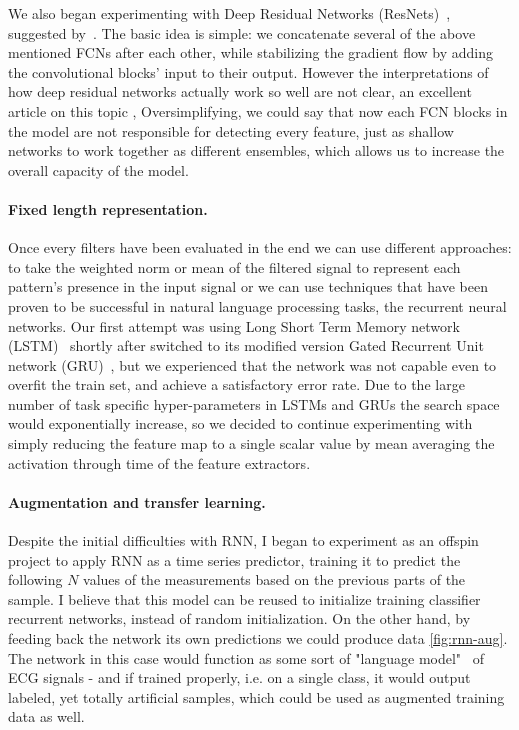 We also began experimenting with Deep Residual Networks (ResNets)~\cite{he2016deep}, suggested by~\cite{wang2016time}.
The basic idea is simple: we concatenate several of the above mentioned FCNs after each other, while stabilizing the gradient flow by adding the convolutional blocks' input to their output.
However the interpretations of how deep residual networks actually work so well are not clear, an excellent article on this topic \cite{resnet-ensembles},
Oversimplifying, we could say that now each FCN blocks in the model are not responsible for detecting every feature, just as shallow networks to work together as different ensembles, which allows us to increase the overall capacity of the model.

\paragraph{Fixed length representation.}
Once every filters have been evaluated in the end we can use different approaches: to take the weighted norm or mean of the filtered signal to represent each pattern's presence in the input signal or we can use techniques that have been proven to be successful in natural language processing tasks, the recurrent neural networks.
Our first attempt was using Long Short Term Memory network (LSTM)~\cite{hochreiter1997long, malhotra2015long} shortly after switched to its modified version Gated Recurrent Unit network (GRU)~\cite{chung2014empirical}, but we experienced that the network was not capable even to overfit the train set, and achieve a satisfactory error rate.
Due to the large number of task specific hyper-parameters in LSTMs and GRUs the search space would exponentially increase, so we decided to continue experimenting with simply reducing the feature map to a single scalar value by mean averaging the activation through time of the feature extractors.

\paragraph{Augmentation and transfer learning.}
Despite the initial difficulties with RNN, I began to experiment as an offspin project to apply RNN as a time series predictor, training it to predict the following $N$ values of the measurements based on the previous parts of the sample. I believe that this model can be reused to initialize training classifier recurrent networks, instead of random initialization.
On the other hand, by feeding back the network its own predictions we could produce data \ref{fig:rnn-aug}. The network in this case would function as some sort of "language model"~\cite{lang-model} of ECG signals - and if trained properly, i.e. on a single class, it would output labeled, yet totally artificial samples, which could be used as augmented training data as well.

